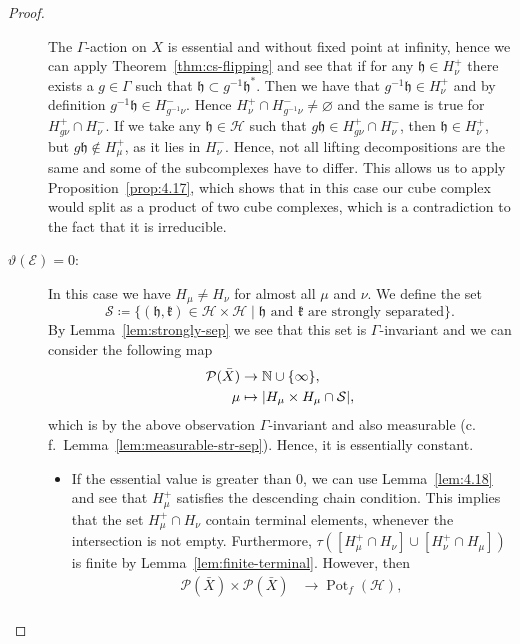 \begin{proof}
\begin{description}
    The \(\Gamma\)-action on \(X\) is essential and without fixed point at infinity, hence we can apply Theorem~\ref{thm:cs-flipping} and see that if for any \(\mathfrak{h} \in H_{\nu}^+\) there exists a \(g \in \Gamma\) such that \(\mathfrak{h} \subset g^{-1}\mathfrak{h}^\ast \). Then we have that \(g^{-1}\mathfrak{h} \in H_\nu^+\) and by definition \(g^{-1} \mathfrak{h} \in H_{g^{-1}\nu}^-\). Hence \(H_\nu^+ \cap H_{g^{-1}\nu}^- \neq \varnothing\) and the same is true for \(H_{g\nu}^+ \cap H_{\nu}^-\). If we take any \(\mathfrak{h} \in \mathcal{H}\) such that \(g\mathfrak{h} \in H_{g\nu}^+ \cap H_\nu^-\), then \(\mathfrak{h} \in H_{\nu}^+\), but \(g\mathfrak{h} \not \in H_\mu^+\), as it lies in \(H_\nu^-\). Hence, not all lifting decompositions are the same and some of the subcomplexes have to differ. This allows us to apply Proposition~\ref{prop:4.17}, which shows that in this case our cube complex would split as a product of two cube complexes, which is a contradiction to the fact that it is irreducible.
  \item[\(\vartheta(\mathcal{E})=0\):] In this case we have \(H_\mu \neq H_\nu\) for almost all \(\mu\) and \(\nu\). We define the set
    \[
      \mathcal{S} \coloneqq \{(\mathfrak{h}, \mathfrak{k}) \in \mathcal{H} \times \mathcal{H} \mid \mathfrak{h} \text{ and } \mathfrak{k} \text{ are strongly separated}\}.
    \]
    By Lemma~\ref{lem:strongly-sep} we see that this set is \(\Gamma\)-invariant and we can consider the following map
    \begin{align*}
      \mathcal{P}(\bar X) &\to \mathbb{N} \cup \{\infty\},\\
      \mu &\mapsto |H_\mu \times H_\mu \cap \mathcal{S}|,
    \end{align*}
    which is by the above observation \(\Gamma\)-invariant and also measurable (c.\,f.\ Lemma~\ref{lem:measurable-str-sep}). Hence, it is essentially constant.
    \begin{itemize}
    \item     If the essential value is greater than 0, we can use Lemma~\ref{lem:4.18} and see that \(H_\mu^+\) satisfies the descending chain condition. This implies that the set \(H_\mu^+ \cap H_\nu\) contain terminal elements, whenever the intersection is not empty. Furthermore, \(\tau([H_\mu^+ \cap H_\nu] \cup [H_\nu^+ \cap H_\mu])\) is finite by Lemma~\ref{lem:finite-terminal}. However, then
      \begin{align*}
        \mathcal{P}(\bar X) \times \mathcal{P}(\bar X) &\to \operatorname{Pot}_f(\mathcal{H}),\\

\end{align*}
\end{itemize}
\end{description}
\end{proof}
